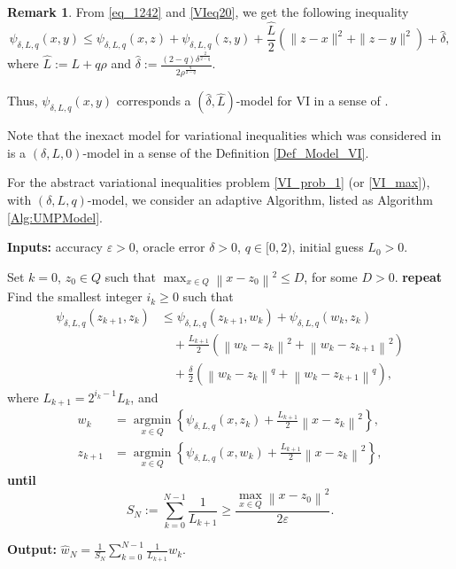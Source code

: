 \documentclass[11pt]{amsart}
\theoremstyle{definition}
\newtheorem{remark}[theorem]{Remark}
\numberwithin{equation}{section}
\begin{document}
\begin{remark}
From \eqref{eq_1242} and \eqref{VIeq20}, we get the following inequality
\[
    \psi_{\delta, L, q}(x,y)   \leq \psi_{\delta, L, q}(x,z)+\psi_{\delta, L, q}(z,y)+ \frac{\widehat{L}}{2}\left(\|z - x\|^2 + \|z- y \|^2 \right) + \widehat{\delta},
\]
where  $\widehat{L} := L + q \rho$ and $\widehat{\delta} := \frac{(2-q) \delta^{\frac{2}{2-q}}}{2\rho^{\frac{q}{2-q}}}$. 

Thus, $\psi_{\delta,L, q} (x, y)$ corresponds a $(\widehat{\delta}, \widehat{L})$-model for VI in a sense of \cite{Stonyakin2021OMS}. 

Note that the inexact model for variational inequalities which was considered in \cite{Stonyakin2021OMS} is a $(\delta, L, 0)$-model in a sense of the Definition \ref{Def_Model_VI}.
\end{remark}

For the abstract variational inequalities problem \eqref{VI_prob_1} (or \eqref{VI_max}),  with $(\delta, L, q)$-model, we consider an adaptive Algorithm, listed as Algorithm \ref{Alg:UMPModel}. 

\begin{algorithm}[htp]
\caption{Generalized Mirror Prox for VIs with $(\delta, L, q)$-model.}
\label{Alg:UMPModel}
\textbf{Inputs:} accuracy $\varepsilon > 0$, oracle error $\delta >0$, $q \in [0, 2)$, initial guess $L_{0} >0$. 
\begin{algorithmic}[1]
\STATE Set $k=0$, $z_0 \in Q$ such that $\max_{x \in Q} \left\|x - z_0\right\|^2 \leq D$, for some $D>0$.
\STATE \textbf{repeat}
\STATE \quad Find the smallest integer $i_k \geq 0$ such that
\begin{equation}\label{eqUMP23}
\begin{aligned}
    \psi_{\delta, L, q}(z_{k+1}, z_{k}) & \leq \psi_{\delta, L, q}(z_{k+1}, w_{k})+\psi_{\delta, L, q}(w_k,z_k) 
    \\& \quad  + \frac{L_{k+1}}{2} \left( \left\|w_k - z_k\right\|^2 + \left\|w_k - z_{k+1}\right\|^2 \right) 
    \\& \quad  +\frac{ \delta}{2} \left(\left\|w_k - z_k\right\|^q + \left\|w_k - z_{k+1}\right\|^q\right),
\end{aligned}
\end{equation}
\quad where 	$L_{k+1}=2^{i_k-1}L_{k}$, and
\begin{align}
    w_k&={\mathop {\arg\min }\limits_{x\in Q}} \left\{\psi_{\delta, L, q}(x, z_k)+ \frac{L_{k+1} }{2}\left\|x -  z_k\right\|^2  \right\}, \label{eq:UMPwStepMod} \\
    z_{k+1}&={\mathop {\arg\min }\limits_{x\in Q}} \left\{\psi_{\delta, L, q}(x, w_k) + \frac{L_{k+1} }{2} \left\|x -  z_k\right\|^2 \right\}, \label{eq:UMPzStepMod}
\end{align}
\STATE \textbf{until}
\begin{equation}\label{eq_Alg3}
    S_N:= \sum_{k=0}^{N-1}\frac{1}{L_{k+1}}\geq \frac{\max_{x \in Q} \left\|x -  z_0\right\|^2}{2 \varepsilon}.
\end{equation}
\end{algorithmic}
\textbf{Output:} $\widehat{w}_N = \frac{1}{S_N}\sum_{k=0}^{N-1}\frac{1}{L_{k+1}}w_k$.
\end{algorithm}
\end{document}
